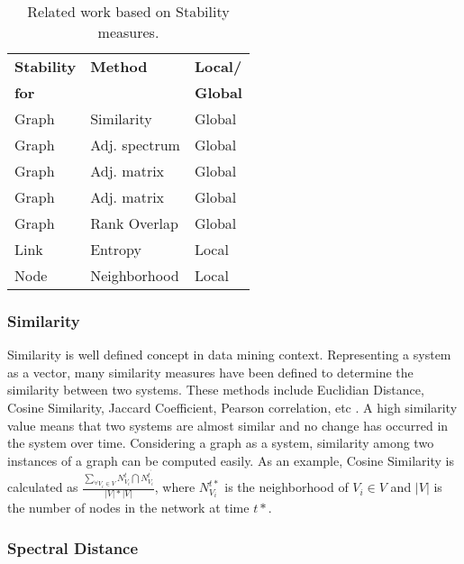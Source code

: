 \documentclass[preprint, twocolumn,5p]{elsarticle}
\begin{document}
    \begin{table}
        \centering
        \begin{tabular}{|l|l|l|}
            \hline
            \textbf{Stability} & \textbf{Method} & \textbf{Local/} \\
            \textbf{for}&&\textbf{Global}\\
            \hline
            Graph & Similarity & Global\\
            Graph & Adj. spectrum \cite{Jurman2010}& Global\\
            Graph & Adj. matrix \cite{Hanneke2010} & Global\\
            Graph & Adj. matrix \cite{Tang2010}& Global\\
            Graph & Rank Overlap \cite{Braha2006, Braha2009}& Global\\
            Link & Entropy \cite{Zayani2012}& Local\\
            Node & Neighborhood \cite{Brust2007}& Local\\
            \hline
        \end{tabular}
        \caption{Related work based on Stability measures.}
        \label{table:R_S_M}
    \end{table}

        \subsubsection{Similarity}\label{subsubsec:similarity}
        Similarity is well defined concept in data mining context. Representing a system as a vector, many similarity measures have been defined to determine the similarity between two systems. These methods include Euclidian Distance, Cosine Similarity, Jaccard Coefficient, Pearson correlation, etc \cite{LibenNowell2003,Lu2011}. A high similarity value means that two systems are almost similar and no change has occurred in the system over time. Considering a graph as a system, similarity among two instances of a graph can be computed easily. As an example, Cosine Similarity is calculated as $\frac{\sum \limits_{\forall V_{i}\in V}N_{V_{i}}^{t}\bigcap N_{V_{i}}^{t^{'}}}{|V|*|V|}$, where $N_{V_{i}}^{t*}$ is the neighborhood of $V_{i}\in V$ and $|V|$ is the number of nodes in the network at time $t*$. 

        \subsubsection{Spectral Distance}\label{subsubsec:spectraldistance}
\end{document}
